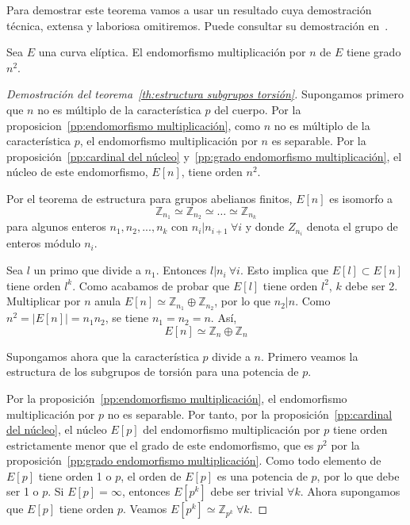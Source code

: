 Para demostrar este teorema vamos a usar un resultado cuya demostración técnica, extensa y laboriosa omitiremos. Puede consultar su demostración en~\cite[sec. 3.2]{Washington:2008}.

\begin{proposicion}\label{pp:grado endomorfismo multiplicación}
	Sea $E$ una curva elíptica. El endomorfismo multiplicación por $n$ de $E$ tiene grado $n^2$.
\end{proposicion}

\begin{proof}[Demostración del teorema~\ref{th:estructura subgrupos torsión}]
Supongamos primero que $n$ no es múltiplo de la característica $p$ del cuerpo. Por la proposicion~\ref{pp:endomorfismo multiplicación}, como $n$ no es múltiplo de la característica $p$, el endomorfismo multiplicación por $n$ es separable. Por la proposición~\ref{pp:cardinal del núcleo} y~\ref{pp:grado endomorfismo multiplicación}, el núcleo de este endomorfismo, $E[n]$, tiene orden $n^2$.

Por el teorema de estructura para grupos abelianos finitos, $E[n]$ es isomorfo a
$$
	\mathbb{Z}_{n_1} \simeq \mathbb{Z}_{n_2} \simeq \ldots \simeq \mathbb{Z}_{n_k}
$$
para algunos enteros $n_1, n_2, ..., n_k$ con $n_i | n_{i+1} \ \forall i$ y donde $Z_{n_i}$ denota el grupo de enteros módulo $n_i$.

Sea $l$ un primo que divide a $n_1$. Entonces $l | n_i \ \forall i$. Esto implica que $E[l] \subset E[n]$ tiene orden $l^k$. Como acabamos de probar que $E[l]$ tiene orden $l^2$, $k$ debe ser 2. Multiplicar por $n$ anula $E[n] \simeq \mathbb{Z}_{n_1} \oplus \mathbb{Z}_{n_2}$, por lo que $n_2 | n$. Como $n^2 = \left\vert{E[n] }\right\vert = n_1 n_2$, se tiene $n_1 = n_2 = n$. Así,
$$
	E[n] \simeq \mathbb{Z}_n \oplus \mathbb{Z}_n
$$

Supongamos ahora que la característica $p$ divide a $n$. Primero veamos la estructura de los subgrupos de torsión para una potencia de $p$.

Por la proposición~\ref{pp:endomorfismo multiplicación}, el endomorfismo multiplicación por $p$ no es separable. Por tanto, por la proposición~\ref{pp:cardinal del núcleo}, el núcleo $E[p]$ del endomorfismo multiplicación por $p$ tiene orden estrictamente menor que el grado de este endomorfismo, que es $p^2$ por la proposición~\ref{pp:grado endomorfismo multiplicación}. Como todo elemento de $E[p]$ tiene orden 1 o $p$, el orden de $E[p]$ es una potencia de $p$, por lo que debe ser 1 o $p$. Si $E[p] = {\infty}$, entonces $E[p^k]$ debe ser trivial $\forall k$. Ahora supongamos que $E[p]$ tiene orden $p$. Veamos $E[p^k] \simeq \mathbb{Z}_{p^k}\ \forall k$.


\end{proof}
